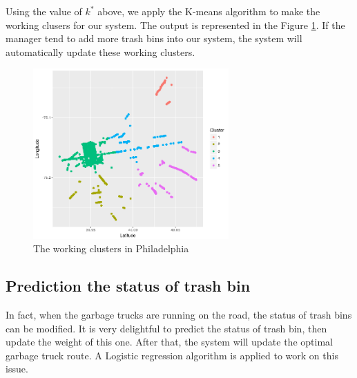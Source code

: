 \documentclass[conference]{IEEEtran}
\begin{document}
\par Using the value of $k^*$ above, we apply the K-means algorithm to make the working clusers for our system. The output is represented in the Figure \ref{fig4}. If the manager tend to add more trash bins into our system, the system will automatically update these working clusters.

\begin{figure}
	\centering
	\includegraphics[width=7.5cm]{workingcluster}
	\caption{The working clusters in Philadelphia}
	\label{fig4}
\end{figure}


\subsection{Prediction the status of trash bin} 

In fact, when the garbage trucks are running on the road, the status of trash bins can be modified. It is very delightful to predict the status of trash bin, then update the weight of this one. After that, the system will update the optimal garbage truck route. A Logistic regression algorithm is applied to work on this issue. 
\end{document}
